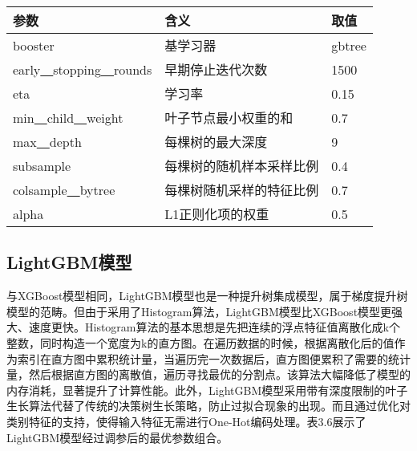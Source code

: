 \begin{table}[!h] 
    \centering
    \footnotesize
    \setlength{\tabcolsep}{20pt}
    \renewcommand{\arraystretch}{1.2}
\begin{tabular}{lll}
\toprule
参数 & 含义 & 取值 \\ \hline
booster & 基学习器 & gbtree \\ 
early\underline{~~}stopping\underline{~~}rounds & 早期停止迭代次数 & 1500 \\ 
eta & 学习率 & 0.15 \\ 
min\underline{~~}child\underline{~~}weight & 叶子节点最小权重的和 & 0.7 \\ 
max\underline{~~}depth & 每棵树的最大深度 & 9 \\
subsample & 每棵树的随机样本采样比例 & 0.4 \\ 
colsample\underline{~~}bytree & 每棵树随机采样的特征比例 & 0.7 \\ 
alpha & L1正则化项的权重 & 0.5 \\ 
\bottomrule
\end{tabular}
\end{table}

\subsection{LightGBM模型}
与XGBoost模型相同，LightGBM模型也是一种提升树集成模型，属于梯度提升树模型的范畴。但由于采用了Histogram算法，LightGBM模型比XGBoost模型更强大、速度更快。Histogram算法的基本思想是先把连续的浮点特征值离散化成k个整数，同时构造一个宽度为k的直方图。在遍历数据的时候，根据离散化后的值作为索引在直方图中累积统计量，当遍历完一次数据后，直方图便累积了需要的统计量，然后根据直方图的离散值，遍历寻找最优的分割点。该算法大幅降低了模型的内存消耗，显著提升了计算性能。此外，LightGBM模型采用带有深度限制的叶子生长算法代替了传统的决策树生长策略，防止过拟合现象的出现。而且通过优化对类别特征的支持，使得输入特征无需进行One-Hot编码处理。表3.6展示了LightGBM模型经过调参后的最优参数组合。

